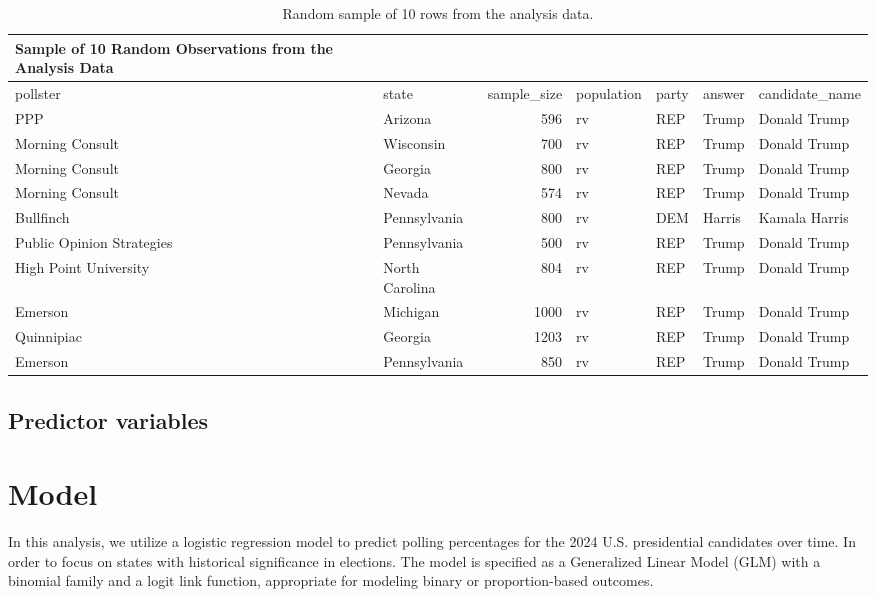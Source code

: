 \documentclass[
  letterpaper,
  DIV=11,
  numbers=noendperiod]{scrartcl}
\begin{document}
\hypertarget{tbl-sample}{}
\begin{longtable}[t]{>{\raggedright\arraybackslash}p{3cm}>{\raggedright\arraybackslash}p{2.5cm}>{}r>{\raggedright\arraybackslash}p{1.5cm}>{\raggedright\arraybackslash}p{1.5cm}ll}
\caption{\label{tbl-sample}Random sample of 10 rows from the analysis data. }Sample of 10 Random Observations from the Analysis Data}\\
\toprule
pollster & state & sample\_size & population & party & answer & candidate\_name\\
\midrule
PPP & Arizona & 596 & rv & REP & Trump & Donald Trump\\
Morning Consult & Wisconsin & 700 & rv & REP & Trump & Donald Trump\\
Morning Consult & Georgia & 800 & rv & REP & Trump & Donald Trump\\
Morning Consult & Nevada & 574 & rv & REP & Trump & Donald Trump\\
Bullfinch & Pennsylvania & 800 & rv & DEM & Harris & Kamala Harris\\
\addlinespace
Public Opinion Strategies & Pennsylvania & 500 & rv & REP & Trump & Donald Trump\\
High Point University & North Carolina & 804 & rv & REP & Trump & Donald Trump\\
Emerson & Michigan & 1000 & rv & REP & Trump & Donald Trump\\
Quinnipiac & Georgia & 1203 & rv & REP & Trump & Donald Trump\\
Emerson & Pennsylvania & 850 & rv & REP & Trump & Donald Trump\\
\bottomrule
\end{longtable}

\hypertarget{predictor-variables}{%
\subsection{Predictor variables}\label{predictor-variables}}

\hypertarget{model}{%
\section{Model}\label{model}}

In this analysis, we utilize a logistic regression model to predict
polling percentages for the 2024 U.S. presidential candidates over time.
In order to focus on states with historical significance in elections.
The model is specified as a Generalized Linear Model (GLM) with a
binomial family and a logit link function, appropriate for modeling
binary or proportion-based outcomes.
\end{document}
